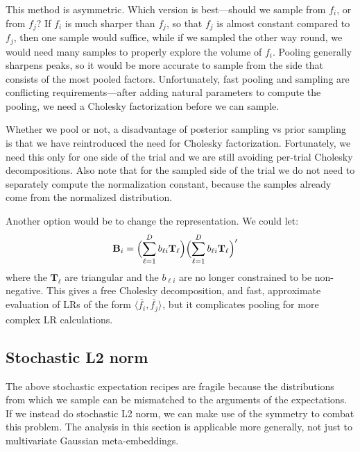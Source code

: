 \documentclass[a4paper,oneside,12pt,english]{report}
\def\expv#1#2{\bigl\langle#1\bigr\rangle_{#2}}
\def\Bmat{\mathbf{B}}
\def\Tmat{\mathbf{T}}
\def\dot#1#2{\expv{#1,#2}{}}
\def\normal#1{\overline{#1}}
\begin{document}
This method is asymmetric. Which version is best---should we sample from $f_i$, or from $f_j$? If $f_i$ is much sharper than $f_j$, so that $f_j$ is almost constant compared to $f_j$, then one sample would suffice, while if we sampled the other way round, we would need many samples to properly explore the volume of $f_i$. Pooling generally sharpens peaks, so it would be more accurate to sample from the side that consists of the most pooled factors. Unfortunately, fast pooling and sampling are conflicting requirements---after adding natural parameters to compute the pooling, we need a Cholesky factorization before we can sample.

Whether we pool or not, a disadvantage of posterior sampling vs prior sampling is that we have reintroduced the need for Cholesky factorization. Fortunately, we need this only for one side of the trial and we are still avoiding per-trial Cholesky decompositions. Also note that for the sampled side of the trial we do not need to separately compute the normalization constant, because the samples already come from the normalized distribution. 

Another option would be to change the representation. We could let:
\begin{align}
\Bmat_i &= \Bigl(\sum_{\ell=1}^D b_{\ell i} \Tmat_\ell \Bigr)\Bigl(\sum_{\ell=1}^D b_{\ell i} \Tmat_\ell \Bigr)'
\end{align}  
where the $\Tmat_\ell$ are triangular and the $b_{\ell i}$ are no longer constrained to be non-negative. This gives a free Cholesky decomposition, and fast, approximate evaluation of LRs of the form $\dot{\normal{f_i}}{\normal{f_j}}$, but it complicates pooling for more complex LR calculations.\\

\subsection{Stochastic L2 norm}
\label{sec:stochL2}
\def\Mset{\mathcal{M}}
The above stochastic expectation recipes are fragile because the distributions from which we sample can be mismatched to the arguments of the expectations. If we instead do stochastic L2 norm, we can make use of the symmetry to combat this problem. The analysis in this section is applicable more generally, not just to multivariate Gaussian meta-embeddings.
\end{document}
